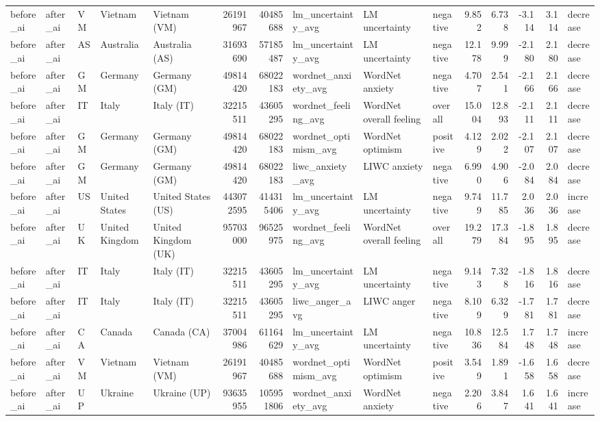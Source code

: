 \begin{tabular}{lllllrrlllrrrrl}
before\_ai & after\_ai & VM & Vietnam & Vietnam (VM) & 26191967 & 40485688 & lm\_uncertainty\_avg & LM uncertainty & negative & 9.852 & 6.738 & -3.114 & 3.114 & decrease \\
before\_ai & after\_ai & AS & Australia & Australia (AS) & 31693690 & 57185487 & lm\_uncertainty\_avg & LM uncertainty & negative & 12.178 & 9.999 & -2.180 & 2.180 & decrease \\
before\_ai & after\_ai & GM & Germany & Germany (GM) & 49814420 & 68022183 & wordnet\_anxiety\_avg & WordNet anxiety & negative & 4.707 & 2.541 & -2.166 & 2.166 & decrease \\
before\_ai & after\_ai & IT & Italy & Italy (IT) & 32215511 & 43605295 & wordnet\_feeling\_avg & WordNet overall feeling & overall & 15.004 & 12.893 & -2.111 & 2.111 & decrease \\
before\_ai & after\_ai & GM & Germany & Germany (GM) & 49814420 & 68022183 & wordnet\_optimism\_avg & WordNet optimism & positive & 4.129 & 2.022 & -2.107 & 2.107 & decrease \\
before\_ai & after\_ai & GM & Germany & Germany (GM) & 49814420 & 68022183 & liwc\_anxiety\_avg & LIWC anxiety & negative & 6.990 & 4.906 & -2.084 & 2.084 & decrease \\
before\_ai & after\_ai & US & United States & United States (US) & 443072595 & 414315406 & lm\_uncertainty\_avg & LM uncertainty & negative & 9.749 & 11.785 & 2.036 & 2.036 & increase \\
before\_ai & after\_ai & UK & United Kingdom & United Kingdom (UK) & 95703000 & 96525975 & wordnet\_feeling\_avg & WordNet overall feeling & overall & 19.279 & 17.384 & -1.895 & 1.895 & decrease \\
before\_ai & after\_ai & IT & Italy & Italy (IT) & 32215511 & 43605295 & lm\_uncertainty\_avg & LM uncertainty & negative & 9.143 & 7.328 & -1.816 & 1.816 & decrease \\
before\_ai & after\_ai & IT & Italy & Italy (IT) & 32215511 & 43605295 & liwc\_anger\_avg & LIWC anger & negative & 8.109 & 6.329 & -1.781 & 1.781 & decrease \\
before\_ai & after\_ai & CA & Canada & Canada (CA) & 37004986 & 61164629 & lm\_uncertainty\_avg & LM uncertainty & negative & 10.836 & 12.584 & 1.748 & 1.748 & increase \\
before\_ai & after\_ai & VM & Vietnam & Vietnam (VM) & 26191967 & 40485688 & wordnet\_optimism\_avg & WordNet optimism & positive & 3.549 & 1.891 & -1.658 & 1.658 & decrease \\
before\_ai & after\_ai & UP & Ukraine & Ukraine (UP) & 93635955 & 105951806 & wordnet\_anxiety\_avg & WordNet anxiety & negative & 2.206 & 3.847 & 1.641 & 1.641 & increase \\

\end{tabular}
